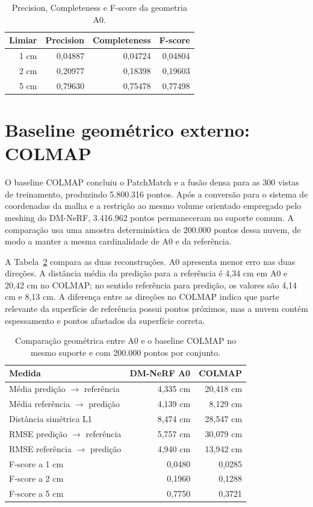 \begin{table}[H]
\centering
\caption{Precision, Completeness e F-score da geometria A0.}
\label{tab:geom_threshold}
\begin{tabular}{rrrr}
\toprule
\textbf{Limiar} & \textbf{Precision} & \textbf{Completeness} & \textbf{F-score} \\
\midrule
1 cm & 0,04887 & 0,04724 & 0,04804 \\
2 cm & 0,20977 & 0,18398 & 0,19603 \\
5 cm & 0,79630 & 0,75478 & 0,77498 \\
\bottomrule
\end{tabular}
\end{table}

\section{Baseline geométrico externo: COLMAP}

O baseline COLMAP concluiu o PatchMatch e a fusão densa para as 300 vistas de treinamento, produzindo 5.800.316 pontos. Após a conversão para o sistema de coordenadas da malha e a restrição ao mesmo volume orientado empregado pelo meshing do DM-NeRF, 3.416.962 pontos permaneceram no suporte comum. A comparação usa uma amostra determinística de 200.000 pontos dessa nuvem, de modo a manter a mesma cardinalidade de A0 e da referência.

A Tabela~\ref{tab:colmap_geom} compara as duas reconstruções. A0 apresenta menor erro nas duas direções. A distância média da predição para a referência é 4,34 cm em A0 e 20,42 cm no COLMAP; no sentido referência para predição, os valores são 4,14 cm e 8,13 cm. A diferença entre as direções no COLMAP indica que parte relevante da superfície de referência possui pontos próximos, mas a nuvem contém espessamento e pontos afastados da superfície correta.

\begin{table}[H]
\centering
\small
\caption{Comparação geométrica entre A0 e o baseline COLMAP no mesmo suporte e com 200.000 pontos por conjunto.}
\label{tab:colmap_geom}
\begin{tabular}{lrr}
\toprule
\textbf{Medida} & \textbf{DM-NeRF A0} & \textbf{COLMAP} \\
\midrule
Média predição $\rightarrow$ referência & 4,335 cm & 20,418 cm \\
Média referência $\rightarrow$ predição & 4,139 cm & 8,129 cm \\
Distância simétrica L1 & 8,474 cm & 28,547 cm \\
RMSE predição $\rightarrow$ referência & 5,757 cm & 30,079 cm \\
RMSE referência $\rightarrow$ predição & 4,940 cm & 13,942 cm \\
\midrule
F-score a 1 cm & 0,0480 & 0,0285 \\
F-score a 2 cm & 0,1960 & 0,1288 \\
F-score a 5 cm & 0,7750 & 0,3721 \\
\bottomrule
\end{tabular}
\end{table}

